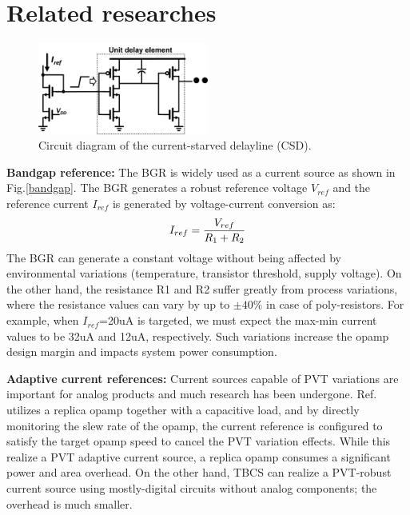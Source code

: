 \documentclass[paper]{ieice}
\begin{document}
\section{Related researches}


\begin{figure}[!t]
\centering
 \includegraphics[width=0.5\textwidth]{figs/inv.png}
  \caption{Circuit diagram of the current-starved delayline (CSD).}
\label{inv}
\end{figure}

\qquad \textbf{Bandgap reference:} The BGR is widely used as a current source as shown in Fig.\ref{bandgap}. The BGR generates a robust reference voltage $V_{ref}$ and the reference current $I_{ref}$ is generated by voltage-current conversion as:
\begin{eqnarray}
    \centering
    I_{ref} = \frac{V_{ref}}{R_1 + R_2}
    \label{sar13b}
\end{eqnarray}
The BGR can generate a constant voltage without being affected by environmental variations (temperature, transistor threshold, supply voltage). On the other hand, the resistance R1 and R2 suffer greatly from process variations, where the resistance values can vary by up to $\pm 40\%$ in case of poly-resistors. For example, when $I_{ref}$=20uA is targeted, we must expect the max-min current values to be 32uA and 12uA, respectively. Such variations increase the opamp design margin and impacts system power consumption.

\textbf{Adaptive current references:} Current sources capable of PVT variations are important for analog products and much research has been undergone. Ref.\cite{chuanyang,ron} utilizes a replica opamp together with a capacitive load, and by directly monitoring the slew rate of the opamp, the current reference is configured to satisfy the target opamp speed to cancel the PVT variation effects.
While this realize a PVT adaptive current source, a replica opamp consumes a significant power and area overhead. On the other hand, TBCS can realize a PVT-robust current source using mostly-digital circuits without analog components; the overhead is much smaller.
\end{document}
